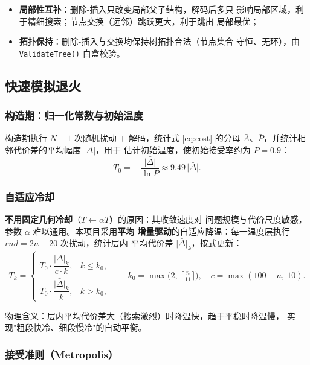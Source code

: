 \documentclass[12pt,a4paper]{article}
\begin{document}
\begin{itemize}
    \item \textbf{局部性互补}：删除-插入只改变局部父子结构，解码后多只
    影响局部区域，利于精细搜索；节点交换（远邻）跳跃更大，利于跳出
    局部最优；
    \item \textbf{拓扑保持}：删除-插入与交换均保持树拓扑合法（节点集合
    守恒、无环），由 \texttt{Validate\-Tree()} 白盒校验。
\end{itemize}

\subsection{快速模拟退火}

\subsubsection{构造期：归一化常数与初始温度}

构造期执行 $N+1$ 次随机扰动 $+$ 解码，统计式 \eqref{eq:cost} 的分母
$\bar A$、$\bar P$，并统计相邻代价差的平均幅度 $\bar{|\Delta|}$，用于
估计初始温度，使初始接受率约为 $P = 0.9$：
\begin{equation}
T_0 = -\,\frac{\bar{|\Delta|}}{\ln P} \approx 9.49\, \bar{|\Delta|}.
\end{equation}

\subsubsection{自适应冷却}

\textbf{不用固定几何冷却}（$T \leftarrow \alpha T$）的原因：其收敛速度对
问题规模与代价尺度敏感，参数 $\alpha$ 难以通用。本项目采用\textbf{平均
增量驱动}的自适应降温：每一温度层执行 $rnd = 2n + 20$ 次扰动，统计层内
平均代价差 $\bar{|\Delta|}_k$，按式更新：
\begin{equation}
T_k = \begin{cases}
T_0 \cdot \dfrac{\bar{|\Delta|}_k}{c \cdot k}, & k \le k_0, \\[1.2em]
T_0 \cdot \dfrac{\bar{|\Delta|}_k}{k}, & k > k_0,
\end{cases}
\qquad
k_0 = \max\!\Big(2,\ \Big\lceil \tfrac{n}{11} \Big\rceil\Big), \quad
c = \max(100 - n,\ 10).
\end{equation}

物理含义：层内平均代价差大（搜索激烈）时降温快，趋于平稳时降温慢，
实现"粗段快冷、细段慢冷"的自动平衡。

\subsubsection{接受准则（Metropolis）}
\end{document}
